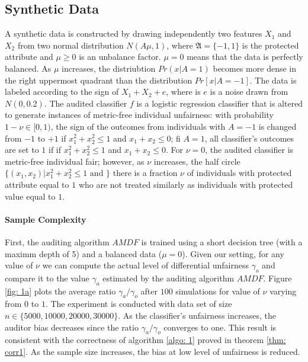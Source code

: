 \documentclass{article}
\begin{document}
\subsection{Synthetic Data}
A synthetic data is constructed by drawing independently two features $X_{1}$ and $X_{2}$ from two normal distribution $N(A\mu, 1)$, where  $\mathfrak{A}=\{-1, 1\}$ is the protected attribute and $\mu \geq 0$ is an unbalance factor. $\mu=0$ means that the data is perfectly balanced. As $\mu$ increases, the distriubtion $Pr(x|A=1)$ becomes more dense in the right uppermost quadrant than the distribution $Pr[x|A=-1]$. The data is labeled according to the sign of $X_{1} + X_{2} + e$, where is $e$ is a noise drawn from $N(0, 0.2)$. The audited classifier $f$ is a logistic regression classifier that is altered to generate instances of metric-free individual unfairness: with probability $1-\nu\in[0, 1)$, the sign of the outcomes from individuals with $A=-1$ is changed from $-1$ to $+1$ if $x^{2}_{1} + x^{2}_{2} \leq 1$ and $x_{1}+ x_{2} \leq 0$; fi $A=1$, all classifier's outcomes are set to $1$ if if $x^{2}_{1} + x^{2}_{2} \leq 1$ and $x_{1}+ x_{2} \leq 0$. For $\nu=0$, the audited classifier is metric-free individual fair; however, as $\nu$ increases, the half circle $\{(x_{1}, x_{2})|x^{2}_{1} + x^{2}_{2} \leq 1 \mbox{ and } \}$ there is a fraction $\nu$ of individuals with protected attribute equal to $1$ who are not treated similarly as individuals with protected value equal to $1$. 

\bigskip
\paragraph{Sample Complexity}
First, the auditing algorithm $AMDF$ is trained using a short decision tree (with a maximm depth of 5) and a balanced data ($\mu=0$). Given our setting, for any value of $\nu$ we can compute the actual level of differential unfairness $\gamma_{o}$ and compare it to the value  $\gamma_{a}$ estimated by the auditing algorithm $AMDF$.  Figure \ref{fig: 1a} plots the average ratio $\gamma_{a}/\gamma_{o}$ after $100$ simulations for value of $\nu$ varying from $0$ to $1$. The experiment is conducted with data set of size $n\in \{5000, 10000, 20000, 30000\}$. As the classifier's unfairness increases, the auditor bias decreases since the ratio $\gamma_{a}/\gamma_{o}$  converges to one. This result is consistent with the correctness of algorithm \ref{algo: 1} proved in theorem \ref{thm: corr1}. As the sample size increases, the bias at low level of unfairness is reduced.
\end{document}
